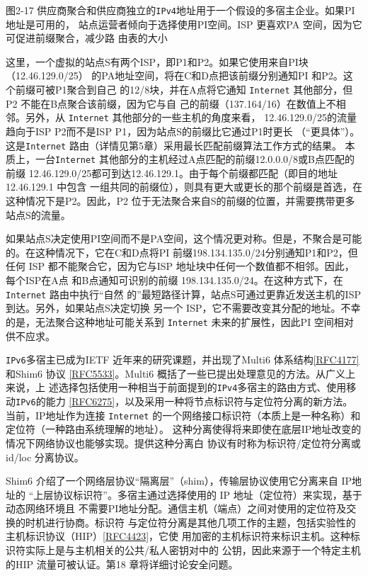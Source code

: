 图2-17 供应商聚合和供应商独立的\verb|IPv4|地址用于一个假设的多宿主企业。如果PI 地址是可用的，
站点运营者倾向于选择使用PI空间。ISP 更喜欢PA 空间，因为它可促进前缀聚合，减少路
由表的大小

这里，一个虚拟的站点S有两个ISP，即P1和P2。如果它使用来自PI块（12.46.129.0/25）
的PA地址空间，将在C和D点把该前缀分别通知PI 和P2。这个前缀可被P1聚合到自己
的12/8块，并在A点将它通知 \verb|Internet| 其他部分，但P2 不能在B点聚合该前缀，因为它与自
己的前缀（137.164/16）在数值上不相邻。另外，从 \verb|Internet| 其他部分的一些主机的角度来看，
12.46.129.0/25的流量趋向于ISP P2而不是ISP P1，因为站点S的前缀比它通过P1时更长
（“更具体”）。这是\verb|Internet| 路由（详情见第5章）采用最长匹配前缀算法工作方式的结果。
本质上，一台\verb|Internet| 其他部分的主机经过A点匹配的前缀12.0.0.0/8或B点匹配的前缀
12.46.129.0/25都可到达12.46.129.1。由于每个前缀都匹配（即目的地址12.46.129.1 中包含
一组共同的前缀位），则具有更大或更长的那个前缀是首选，在这种情况下是P2。因此，P2
位于无法聚合来自S的前缀的位置，并需要携带更多站点S的流量。

如果站点S决定使用PI空间而不是PA空间，这个情况更对称。但是，不聚合是可能
的。在这种情况下，它在C和D点将PI 前缀198.134.135.0/24分别通知P1和P2，但任何
ISP 都不能聚合它，因为它与ISP 地址块中任何一个数值都不相邻。因此，每个ISP在A点
和B点通知可识别的前缀 198.134.135.0/24。在这种方式下，在\verb|Internet| 路由中执行“自然
的”最短路径计算，站点S可通过更靠近发送主机的ISP 到达。另外，如果站点S决定切换
另一个 ISP，它不需要改变其分配的地址。不幸的是，无法聚合这种地址可能关系到 \verb|Internet|
未来的扩展性，因此PI 空间相对供不应求。

\verb|IPv6|多宿主已成为IETF 近年来的研究课题，并出现了Multi6 体系结构\href{https://www.rfc-editor.org/rfc/rfc4177}{[RFC4177]}
和Shim6 协议 \href{https://www.rfc-editor.org/rfc/rfc5533}{[RFC5533]}。Multi6 概括了一些已提出处理意见的方法。从广义上来说，上
述选择包括使用一种相当于前面提到的\verb|IPv4|多宿主的路由方式、使用移动\verb|IPv6|的能力
\href{https://www.rfc-editor.org/rfc/rfc6275}{[RFC6275]}，以及采用一种将节点标识符与定位符分离的新方法。当前，IP地址作为连接
\verb|Internet| 的一个网络接口标识符（本质上是一种名称）和定位符（一种路由系统理解的地址）。
这种分离使得将来即使在底层IP地址改变的情况下网络协议也能够实现。提供这种分离白
协议有时称为标识符/定位符分离或id/loc 分离协议。

Shim6 介绍了一个网络层协议“隔离层”（shim），传输层协议使用它分离来自 IP地址的
“上层协议标识符”。多宿主通过选择使用的 IP 地址（定位符）来实现，基于动态网络环境且
不需要PI地址分配。通信主机（端点）之间对使用的定位符及交换的时机进行协商。标识符
与定位符分离是其他几项工作的主题，包括实验性的主机标识协议（HIP）\href{https://www.rfc-editor.org/rfc/rfc4423}{[RFC4423]}，它使
用加密的主机标识符来标识主机。这种标识符实际上是与主机相关的公共/私人密钥对中的
公钥，因此来源于一个特定主机的HIP 流量可被认证。第18 章将详细讨论安全问题。

